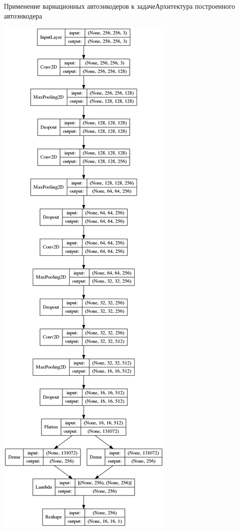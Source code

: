 \documentclass{beamer}
\begin{document}
\begin{frame}{Применение вариационных автоэнкодеров к задаче}{Архитектура построенного автоэнкодера}

\begin{minipage}{0.1\textwidth}
	\begin{flushleft}
		\includegraphics[scale=0.115]{encoder}

\end{flushleft}
\end{minipage}
\end{frame}
\end{document}
